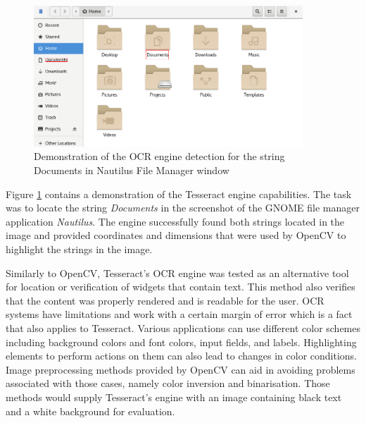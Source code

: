 \begin{figure}[H]
	\centering
	\includegraphics[width=0.9\textwidth]{obrazky-figures/ocr+nautilus.png}
	\caption{Demonstration of the OCR engine detection for the string Documents in Nautilus File Manager window}
	\label{ocr_nautilus}
\end{figure}

Figure \ref{ocr_nautilus} contains a demonstration of the Tesseract engine capabilities. The task was to locate the string \textit{Documents} in the screenshot of the GNOME file manager application \textit{Nautilus}.
The engine successfully found both strings located in the image and provided coordinates and dimensions that were used by OpenCV to highlight the strings in the image. 

Similarly to OpenCV, Tesseract's OCR engine was tested as an alternative tool for location or verification of widgets that contain text. This method also verifies that the content was properly rendered and is readable for the user. OCR systems have limitations and work with a certain margin of error which is a fact that also applies to Tesseract. Various applications can use different color schemes including background colors and font colors, input fields, and labels. Highlighting elements to perform actions on them can also lead to changes in color conditions. Image preprocessing methods provided by OpenCV can aid in avoiding problems associated with those cases, namely color inversion and binarisation. Those methods would supply Tesseract's engine with an image containing black text and a white background for evaluation.

